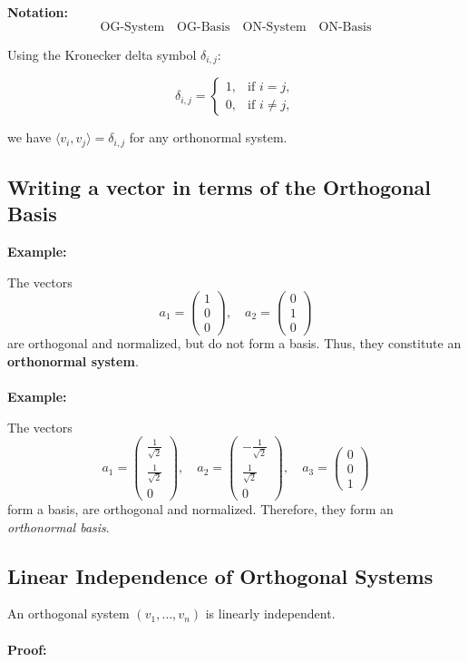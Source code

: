 \textbf{Notation:}
\[
\text{OG-System} \quad \text{OG-Basis} \quad \text{ON-System} \quad \text{ON-Basis}
\]

Using the Kronecker delta symbol \( \delta_{i,j} \):

\[
\delta_{i,j} =
\begin{cases}
1, & \text{if } i = j, \\
0, & \text{if } i \neq j,
\end{cases}
\]

we have \( \langle v_i, v_j \rangle = \delta_{i,j} \) for any orthonormal system.

\subsection{Writing a vector in terms of the Orthogonal Basis}
\textbf{Example:} 

The vectors
\[
a_1 =
\begin{pmatrix}
1 \\
0 \\
0
\end{pmatrix}, \quad
a_2 =
\begin{pmatrix}
0 \\
1 \\
0
\end{pmatrix}
\]
are orthogonal and normalized, but do not form a basis. Thus, they constitute an \textbf{orthonormal system}.
\\\\
\textbf{Example:} 

The vectors
\[
a_1 =
\begin{pmatrix}
\frac{1}{\sqrt{2}} \\
\frac{1}{\sqrt{2}} \\
0
\end{pmatrix}, \quad
a_2 =
\begin{pmatrix}
-\frac{1}{\sqrt{2}} \\
\frac{1}{\sqrt{2}} \\
0
\end{pmatrix}, \quad
a_3 =
\begin{pmatrix}
0 \\
0 \\
1
\end{pmatrix}
\]
form a basis, are orthogonal and normalized. Therefore, they form an \emph{orthonormal basis}.

\subsection{Linear Independence of Orthogonal Systems}
An orthogonal system \( (v_1, \ldots, v_n) \) is linearly independent.
\\\\
\textbf{Proof:} 

